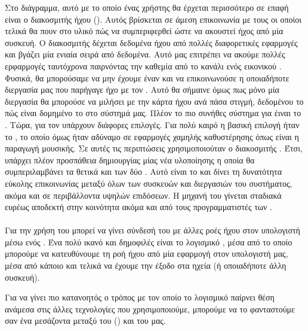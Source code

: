 \documentclass[12pt]{extarticle}
\begin{document}
Στο διάγραμμα, αυτό με το οποίο ένας χρήστης θα έρχεται περισσότερο σε επαφή
είναι ο διακοσμιτής ήχου (). Αυτός βρίσκεται σε άμεση
επικοινωνία με τους  οι οποίοι τελικά θα πουν στο υλικό πώς να
συμπεριφερθεί ώστε να ακουστεί ήχος από μία συσκευή. Ο διακοσμιτής δέχεται
δεδομένα ήχου από πολλές διαφορετικές εφαρμογές και βγάζει μία ενιαία σειρά από
δεδομένα. Αυτό μας επιτρέπει να ακούμε πολλές ερφαρμογές ταυτόχρονα παιρνόντας
την καθεμία από το κανάλι ενός εικονικού . Φυσικά, θα μπορούσαμε να
μην έχουμε έναν  και να επικοινωνούσε η οποιαδήποτε διεργασία
μας που παρήγαγε ήχο με τον . Αυτό θα σήμαινε όμως πως μόνο μία
διεργασία θα μπορούσε να μιλήσει με την κάρτα ήχου ανά πάσα στιγμή, δεδομένου
το πώς είναι δομημένο το  στο σύστημά μας. Πλέον το πιο
συνήθες σύστημα για  έιναι το . \cite{ALSA} Τώρα,
για τον  υπάρχουν διάφορες επιλογές. Για πολύ καιρό η βασική
επιλογή ήταν το  \cite{PulseAudio}, το οποίο όμως ήταν αδύναμο
σε εφαρμογές χαμηλής καθυστέρησης όπως είναι η παραγωγή μουσικής. Σε αυτές τις
περιπτώσεις χρησιμοποιούταν ο διακοσμιτής  \cite{JACK}.
Έτσι, υπάρχει πλέον προσπάθεια δημιουργίας μίας νέα υλοποίησης η οποία 
θα συμπεριλαμβάνει τα θετικά και των δύο . Αυτό είναι 
το  \cite{Pipewire} και δίνει τη δυνατότητα εύκολης 
επικοινωνίας μεταξύ όλων των συσκευών και διεργασιών του συστήματος,
ακόμα και σε περιβάλλοντα υψηλών επιδόσεων. Η μηχανή του  
γίνεται σταδιακά ευρέως αποδεκτή στην κοινότητα ακόμα και από τους 
προγραμματιστές των  . \cite{PipewireLWNArt}

\paragraph{}

Για την χρήση του   μπορεί να γίνει 
σύνδεσή του με άλλες ροές ήχου στον υπολογιστή μέσω ενός .
Ένα πολύ ικανό και δημοφιλές είναι το λογισμικό  \cite{CarlaApp}, 
μέσα από το οποίο μπορούμε να κατευθύνουμε τη ροή ήχου από μία εφαρμογή 
στον υπολογιστή μας, μέσα από κάποιο  και τελικά να έχουμε την έξοδο 
στα ηχεία (ή οποιαδήποτε άλλη συσκευή).

Για να γίνει πιο κατανοητός ο τρόπος με τον οποίο 
το λογισμικό  παίρνει θέση ανάμεσα στις άλλες τεχνολογίες 
που χρησιμοποιούμε, μπορούμε να το φανταστούμε σαν ένα μεσάζοντα μεταξύ του 
 () και του  μας.
\end{document}
